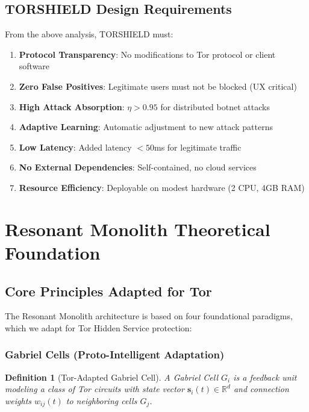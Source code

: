 \documentclass[11pt,a4paper]{article}
\newtheorem{definition}{Definition}[section]
\begin{document}
\subsection{TORSHIELD Design Requirements}

From the above analysis, TORSHIELD must:

\begin{enumerate}
\item \textbf{Protocol Transparency}: No modifications to Tor protocol or client software
\item \textbf{Zero False Positives}: Legitimate users must not be blocked (UX critical)
\item \textbf{High Attack Absorption}: $\eta > 0.95$ for distributed botnet attacks
\item \textbf{Adaptive Learning}: Automatic adjustment to new attack patterns
\item \textbf{Low Latency}: Added latency $< 50$ms for legitimate traffic
\item \textbf{No External Dependencies}: Self-contained, no cloud services
\item \textbf{Resource Efficiency}: Deployable on modest hardware (2 CPU, 4GB RAM)
\end{enumerate}

\newpage
\section{Resonant Monolith Theoretical Foundation}

\subsection{Core Principles Adapted for Tor}

The Resonant Monolith architecture is based on four foundational paradigms, which we adapt for Tor Hidden Service protection:

\subsubsection{Gabriel Cells (Proto-Intelligent Adaptation)}

\begin{definition}[Tor-Adapted Gabriel Cell]
A Gabriel Cell $G_i$ is a feedback unit modeling a class of Tor circuits with state vector $\mathbf{s}_i(t) \in \mathbb{R}^d$ and connection weights $w_{ij}(t)$ to neighboring cells $G_j$.
\end{definition}
\end{document}
